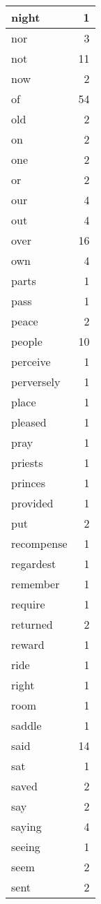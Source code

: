 \begin{center}
\begin{longtable}{l|r}
night & 1 \\ \hline
nor & 3 \\ \hline
not & 11 \\ \hline
now & 2 \\ \hline
of & 54 \\ \hline
old & 2 \\ \hline
on & 2 \\ \hline
one & 2 \\ \hline
or & 2 \\ \hline
our & 4 \\ \hline
out & 4 \\ \hline
over & 16 \\ \hline
own & 4 \\ \hline
parts & 1 \\ \hline
pass & 1 \\ \hline
peace & 2 \\ \hline
people & 10 \\ \hline
perceive & 1 \\ \hline
perversely & 1 \\ \hline
place & 1 \\ \hline
pleased & 1 \\ \hline
pray & 1 \\ \hline
priests & 1 \\ \hline
princes & 1 \\ \hline
provided & 1 \\ \hline
put & 2 \\ \hline
recompense & 1 \\ \hline
regardest & 1 \\ \hline
remember & 1 \\ \hline
require & 1 \\ \hline
returned & 2 \\ \hline
reward & 1 \\ \hline
ride & 1 \\ \hline
right & 1 \\ \hline
room & 1 \\ \hline
saddle & 1 \\ \hline
said & 14 \\ \hline
sat & 1 \\ \hline
saved & 2 \\ \hline
say & 2 \\ \hline
saying & 4 \\ \hline
seeing & 1 \\ \hline
seem & 2 \\ \hline
sent & 2 \\ \hline

\end{longtable}
\end{center}
